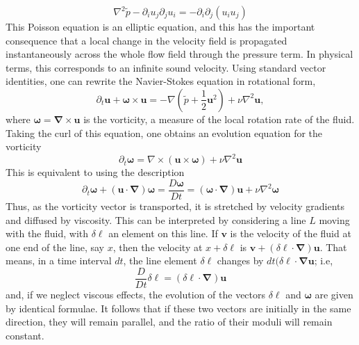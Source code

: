 \begin{equation}
    \nabla^2\tilde{p}-\partial_iu_j\partial_ju_i=-\partial_i\partial_j(u_iu_j)
\end{equation}
This Poisson equation is an elliptic equation, and this has the important consequence that a local change in the velocity field is propagated instantaneously across the whole flow field through the pressure term. In physical terms, this corresponds to an infinite sound velocity.
Using standard vector identities, one can rewrite the Navier-Stokes equation in rotational form,
\begin{equation}
    \partial_t\mathbf{u}+\boldsymbol{\omega}\times\mathbf{u}=-\nabla\left(\tilde{p}+\frac{1}{2}\mathbf{u}^2\right)+\nu\nabla^2\mathbf{u}, 
\end{equation}
where $\boldsymbol{\omega}=\boldsymbol{\nabla}\times\mathbf{u}$ is the vorticity, a measure of the local rotation rate of the fluid. Taking the curl of this
equation, one obtains an evolution equation for the vorticity
\begin{equation}
    \partial_t\boldsymbol{\omega}=\nabla\times(\mathbf{u}\times\boldsymbol{\omega})+\nu\nabla^2\mathbf{u}
\end{equation}
This is equivalent to using the description 
\begin{equation}
    \partial_t\boldsymbol{\omega}+(\mathbf{u}\cdot\boldsymbol{\nabla})\boldsymbol{\omega}=\frac{D\boldsymbol{\omega}}{Dt}=(\boldsymbol{\omega}\cdot\boldsymbol{\nabla})\mathbf{u}+\nu\nabla^2\boldsymbol{\omega}
\end{equation}
Thus, as the vorticity vector is transported, it is stretched by velocity gradients and diffused by viscosity. This can be interpreted by considering a line $L$ moving with the fluid, with $\delta\ell$ an element on this line. If $\mathbf{v}$ is the velocity of the fluid at one end of the line, say $x$, then the velocity at $x+\delta\ell$ is $\mathbf{v}+(\delta\ell\cdot\boldsymbol{\nabla})\mathbf{u}$. That means, in a time interval $dt$, the line element $\delta\ell$ changes by $dt(\delta\ell\cdot\boldsymbol{\nabla}\mathbf{u}$; i.e,
\begin{equation}
    \frac{D}{Dt}\delta\ell=(\delta\ell\cdot\boldsymbol{\nabla})\mathbf{u}
\end{equation}
and, if we neglect viscous effects, the evolution of the vectors $\delta\ell$ and $\boldsymbol{\omega}$ are given by identical formulae. It follows that if these two vectors are initially in the same direction, they will remain parallel, and the ratio of their moduli will remain constant. 
